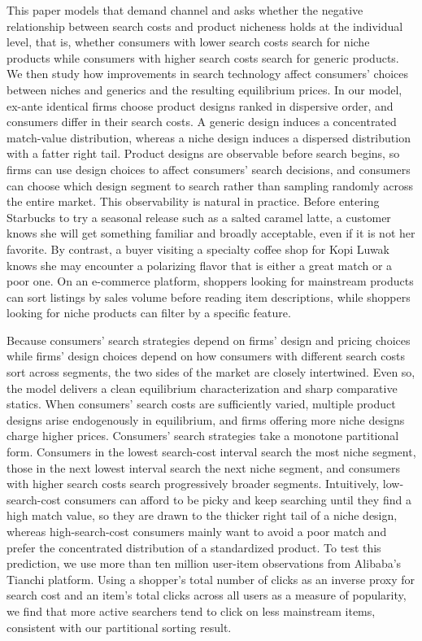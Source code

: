 \documentclass[14pt]{article}
\theoremstyle{plain}
\theoremstyle{definition}
\theoremstyle{remark}
\DeclareRobustCommand\1{\futurelet\oneNext\oneCheck}
\begin{document}
This paper models that demand channel and asks whether the negative relationship between search costs and product nicheness holds at the individual level, that is, whether consumers with lower search costs search for niche products while consumers with higher search costs search for generic products. We then study how improvements in search technology affect consumers' choices between niches and generics and the resulting equilibrium prices. In our model, ex-ante identical firms choose product designs ranked in dispersive order, and consumers differ in their search costs. A generic design induces a concentrated match-value distribution, whereas a niche design induces a dispersed distribution with a fatter right tail. Product designs are observable before search begins, so firms can use design choices to affect consumers' search decisions, and consumers can choose which design segment to search rather than sampling randomly across the entire market. This observability is natural in practice. Before entering Starbucks to try a seasonal release such as a salted caramel latte, a customer knows she will get something familiar and broadly acceptable, even if it is not her favorite. By contrast, a buyer visiting a specialty coffee shop for Kopi Luwak knows she may encounter a polarizing flavor that is either a great match or a poor one. On an e-commerce platform, shoppers looking for mainstream products can sort listings by sales volume before reading item descriptions, while shoppers looking for niche products can filter by a specific feature.

Because consumers' search strategies depend on firms' design and pricing choices while firms' design choices depend on how consumers with different search costs sort across segments, the two sides of the market are closely intertwined. Even so, the model delivers a clean equilibrium characterization and sharp comparative statics. When consumers' search costs are sufficiently varied, multiple product designs arise endogenously in equilibrium, and firms offering more niche designs charge higher prices. Consumers' search strategies take a monotone partitional form. Consumers in the lowest search-cost interval search the most niche segment, those in the next lowest interval search the next niche segment, and consumers with higher search costs search progressively broader segments. Intuitively, low-search-cost consumers can afford to be picky and keep searching until they find a high match value, so they are drawn to the thicker right tail of a niche design, whereas high-search-cost consumers mainly want to avoid a poor match and prefer the concentrated distribution of a standardized product. To test this prediction, we use more than ten million user-item observations from Alibaba's Tianchi platform. Using a shopper's total number of clicks as an inverse proxy for search cost and an item's total clicks across all users as a measure of popularity, we find that more active searchers tend to click on less mainstream items, consistent with our partitional sorting result.
\end{document}
